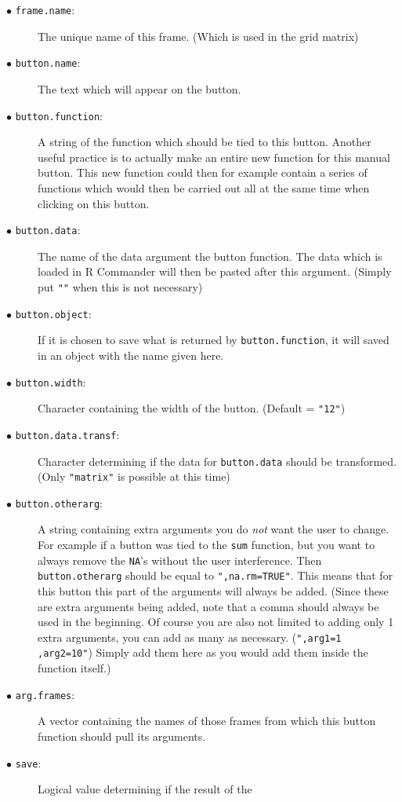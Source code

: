 \documentclass[a4paper]{article}\usepackage[]{graphicx}\usepackage[]{color}
\begin{document}
\begin{description}
  \item[$\bullet$ \texttt{frame.name}:] The unique name of this frame. (Which is used in the grid matrix)
  \item[$\bullet$ \texttt{button.name}:] The text which will appear on the
  button. 
  \item[$\bullet$ \texttt{button.function}:] A string of the function which
  should be tied to this button. Another useful practice is to actually make an entire
  new function for this manual button. This new function could then for
  example contain a series of functions which would then be carried
  out all at the same time when clicking on this button.
  \item[$\bullet$ \texttt{button.data}:] The name of the data argument the
  button function. The data which is loaded in R Commander will then be
  pasted after this argument. (Simply put \verb|""| when this is not necessary)
  \item[$\bullet$ \texttt{button.object}:] If it is chosen to save what is
  returned by \verb|button.function|, it will saved in an object with the name
  given here.
  \item[$\bullet$ \texttt{button.width}:] Character containing the width of the
  button. (Default = \verb|"12"|)
  \item[$\bullet$ \texttt{button.data.transf}:] Character determining if the
  data for \verb|button.data| should be transformed. (Only \verb|"matrix"| is
  possible at this time)
  \item[$\bullet$ \texttt{button.otherarg}:] A string containing extra arguments you
  do {\it not} want the user to change. For example if a button was tied to the
  \verb|sum| function, but you want to always remove the \verb|NA|'s without the
  user interference. Then \verb|button.otherarg| should be equal to
  \verb|",na.rm=TRUE"|. This means that for this button this part of the
  arguments will always be added. (Since these are extra arguments being added,
  note that a comma should always be used in the beginning. Of course you are
  also not limited to adding only 1 extra arguments, you can add as many as
  necessary. (\verb|",arg1=1 ,arg2=10"|) Simply add them here as you would add
  them inside the function itself.)
  \item[$\bullet$ \texttt{arg.frames}:] A vector containing the names of those
  frames from which this button function should pull its arguments.
  \item[$\bullet$ \texttt{save}:] Logical value determining if the result of the

\end{description}
\end{document}
